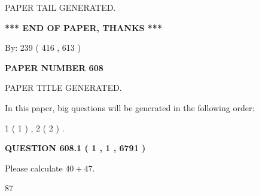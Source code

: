 \documentclass[12pt]{article}
\begin{document}
   
   
\vspace{2.0in} PAPER TAIL GENERATED.
   
   
   
   
\vspace{1.0in} 
{\textbf{\large{ *** END OF PAPER, THANKS *** }}} 
   
   
\hspace{1.0in} By: 
 239 ( 416 ,  613 )
   
   
   
   
\newpage 
\setcounter{page}{ 
   608001 } 
   
   
   
   
 {\textbf{ \Large{ PAPER NUMBER  608  }}}
   
   
\vspace{0.2in}
   
   
   
   
   
   
   
   
 \vspace{0.2in}
 
 
 
 
   
   
 PAPER TITLE GENERATED.
   
   
   
\vspace{0.2in}
   
In this paper, big questions will be generated in the following order: 
   
   
   1 ( 1 )
 ,
   2 ( 2 )
 .
  
\vspace{0.2in}
  
{\textbf{\Large{QUESTION
608.1 
 ( 1 , 1 , 6791 )
}}}
  
  
 
Please calculate $ %
40 +  %
47 $.
 
 
 
\noindent{}
 
 

87
 
 
\noindent{}
 
 

 
 
 
\noindent{}
 
\end{document}
